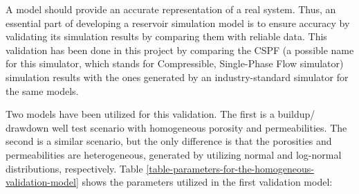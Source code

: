 A model should provide an accurate representation of a real system.
%
Thus, an essential part of developing a reservoir simulation model is to ensure accuracy by validating its simulation results by comparing them with reliable data. 
%
This validation has been done in this project by comparing the CSPF (a possible name for this simulator, which stands for Compressible, Single-Phase Flow simulator) simulation results with the ones generated by an industry-standard simulator for the same models.

Two models have been utilized for this validation.
%
The first is a buildup/ drawdown well test scenario with homogeneous porosity and permeabilities.
%
The second is a similar scenario, but the only difference is that the porosities and permeabilities are heterogeneous, generated by utilizing normal and log-normal distributions, respectively.
%
Table \ref{table-parameters-for-the-homogeneous-validation-model} shows the parameters utilized in the first validation model:
%
%
